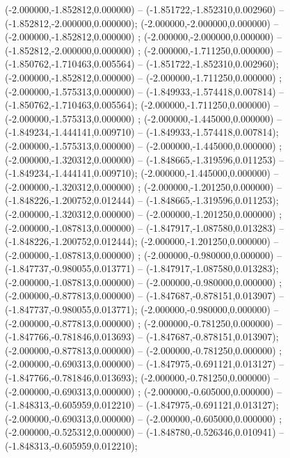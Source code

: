  (-2.000000,-1.852812,0.000000) -- (-1.851722,-1.852310,0.002960) -- (-1.852812,-2.000000,0.000000);
 (-2.000000,-2.000000,0.000000) -- (-2.000000,-1.852812,0.000000) ;
 (-2.000000,-2.000000,0.000000) -- (-1.852812,-2.000000,0.000000) ;
 (-2.000000,-1.711250,0.000000) -- (-1.850762,-1.710463,0.005564) -- (-1.851722,-1.852310,0.002960);
 (-2.000000,-1.852812,0.000000) -- (-2.000000,-1.711250,0.000000) ;
 (-2.000000,-1.575313,0.000000) -- (-1.849933,-1.574418,0.007814) -- (-1.850762,-1.710463,0.005564);
 (-2.000000,-1.711250,0.000000) -- (-2.000000,-1.575313,0.000000) ;
 (-2.000000,-1.445000,0.000000) -- (-1.849234,-1.444141,0.009710) -- (-1.849933,-1.574418,0.007814);
 (-2.000000,-1.575313,0.000000) -- (-2.000000,-1.445000,0.000000) ;
 (-2.000000,-1.320312,0.000000) -- (-1.848665,-1.319596,0.011253) -- (-1.849234,-1.444141,0.009710);
 (-2.000000,-1.445000,0.000000) -- (-2.000000,-1.320312,0.000000) ;
 (-2.000000,-1.201250,0.000000) -- (-1.848226,-1.200752,0.012444) -- (-1.848665,-1.319596,0.011253);
 (-2.000000,-1.320312,0.000000) -- (-2.000000,-1.201250,0.000000) ;
 (-2.000000,-1.087813,0.000000) -- (-1.847917,-1.087580,0.013283) -- (-1.848226,-1.200752,0.012444);
 (-2.000000,-1.201250,0.000000) -- (-2.000000,-1.087813,0.000000) ;
 (-2.000000,-0.980000,0.000000) -- (-1.847737,-0.980055,0.013771) -- (-1.847917,-1.087580,0.013283);
 (-2.000000,-1.087813,0.000000) -- (-2.000000,-0.980000,0.000000) ;
 (-2.000000,-0.877813,0.000000) -- (-1.847687,-0.878151,0.013907) -- (-1.847737,-0.980055,0.013771);
 (-2.000000,-0.980000,0.000000) -- (-2.000000,-0.877813,0.000000) ;
 (-2.000000,-0.781250,0.000000) -- (-1.847766,-0.781846,0.013693) -- (-1.847687,-0.878151,0.013907);
 (-2.000000,-0.877813,0.000000) -- (-2.000000,-0.781250,0.000000) ;
 (-2.000000,-0.690313,0.000000) -- (-1.847975,-0.691121,0.013127) -- (-1.847766,-0.781846,0.013693);
 (-2.000000,-0.781250,0.000000) -- (-2.000000,-0.690313,0.000000) ;
 (-2.000000,-0.605000,0.000000) -- (-1.848313,-0.605959,0.012210) -- (-1.847975,-0.691121,0.013127);
 (-2.000000,-0.690313,0.000000) -- (-2.000000,-0.605000,0.000000) ;
 (-2.000000,-0.525312,0.000000) -- (-1.848780,-0.526346,0.010941) -- (-1.848313,-0.605959,0.012210);
